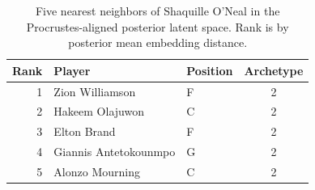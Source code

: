 \begin{table}[htbp]
  \centering\small
  \begin{tabular}{rllc}
    \toprule
    Rank & Player & Position & Archetype \\
    \midrule
    1 & Zion Williamson & F & 2 \\
    2 & Hakeem Olajuwon & C & 2 \\
    3 & Elton Brand & F & 2 \\
    4 & Giannis Antetokounmpo & G & 2 \\
    5 & Alonzo Mourning & C & 2 \\
    \bottomrule
  \end{tabular}
  \caption{Five nearest neighbors of Shaquille O'Neal in the Procrustes-aligned posterior latent space. Rank is by posterior mean embedding distance.}
  \label{tab:Shaquille_O_Neal_neighbors}
\end{table}

